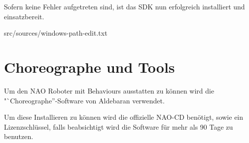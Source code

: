             Sofern keine Fehler aufgetreten sind, ist das SDK nun erfolgreich
            installiert und einsatzbereit.

            
                             {src/sources/windows-path-edit.txt}

    \section{Choreographe und Tools}
        \label{chap:inst:choero}

        Um den NAO Roboter mit Behaviours ausstatten zu können wird die
        "`Choreographe''-Software von Aldebaran verwendet.

        Um diese Installieren zu können wird die offizielle NAO-\ac{CD}
        benötigt, sowie ein Lizenzschlüssel, falls beabsichtigt wird die
        Software für mehr als 90 Tage zu benutzen.

